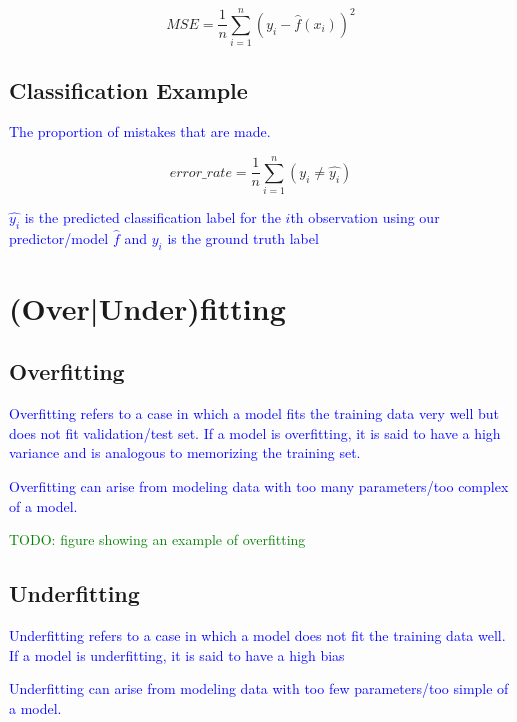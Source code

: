 \begin{equation}
{MSE = \frac{1}{n}\sum_{i=1}^{n}(y_i - \hat{f}(x_i))^2}
\label{eq:MSE_def}
\end{equation}


\subsection{Classification Example}

\textcolor{blue}{The proportion of mistakes that are made.}

\begin{equation}
{error\_rate = \frac{1}{n}\sum_{i=1}^{n}(y_i \ne \hat{y_i})}
\label{eq:class_error_rate_def}
\end{equation}

\textcolor{blue}{$\hat{y_i}$ is the predicted classification label for the $i$th observation using our predictor/model $\hat{f}$ and $y_i$ is the ground truth label}

\section{(Over|Under)fitting}

\subsection{Overfitting}

\textcolor{blue}{Overfitting refers to a case in which a model fits the training data very well but does not fit validation/test set. If a model is overfitting, it is said to have a high variance and is analogous to memorizing the training set.}

\textcolor{blue}{Overfitting can arise from modeling data with too many parameters/too complex of a model.}

\textcolor{green}{TODO: figure showing an example of overfitting}

\subsection{Underfitting}

\textcolor{blue}{Underfitting refers to a case in which a model does not fit the training data well. If a model is underfitting, it is said to have a high bias}

\textcolor{blue}{Underfitting can arise from modeling data with too few parameters/too simple of a model.}

